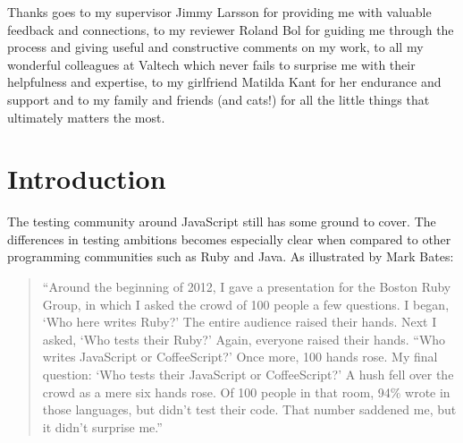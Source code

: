 \documentclass[11pt]{article}
\begin{document}
Thanks goes to my supervisor Jimmy Larsson for providing me with valuable feedback and connections, to my reviewer Roland Bol for guiding me through the process and giving useful and constructive comments on my work, to all my wonderful colleagues at Valtech which never fails to surprise me with their helpfulness and expertise, to my girlfriend Matilda Kant for her endurance and support and to my family and friends (and cats!) for all the little things that ultimately matters the most.

\newpage
\clearpage\mbox{}\clearpage
\newpage

\tableofcontents

\newpage
\clearpage\mbox{}\clearpage
\newpage


\section{Introduction}

The testing community around JavaScript still has some ground to cover. The differences in testing ambitions becomes especially clear when compared to other programming communities such as Ruby and Java. As illustrated by Mark Bates\cite{TestingStatistics}:

\begin{quote}
``Around the beginning of 2012, I gave a presentation for the Boston Ruby Group, in which I asked the crowd of 100 people a few questions. I began, `Who here writes Ruby?' The entire audience raised their hands. Next I asked, `Who tests their Ruby?' Again, everyone raised their hands. ``Who writes JavaScript or CoffeeScript?' Once more, 100 hands rose. My final question: `Who tests their JavaScript or CoffeeScript?' A hush fell over the crowd as a mere six hands rose. Of 100 people in that room, 94\% wrote in those languages, but didn't test their code. That number saddened me, but it didn't surprise me.''
\end{quote}
\end{document}
